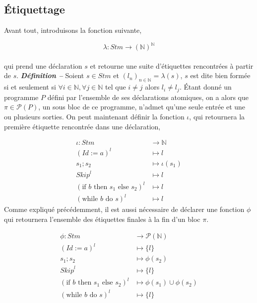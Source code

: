 \documentclass[a4paper, 12pt]{article}
\begin{document}
\subsection{Étiquettage}
Avant tout, introduisons la fonction suivante,

$$\lambda: Stm \longrightarrow (\mathbb{N})^\mathbb{N}$$\\
qui prend une déclaration $s$ et retourne une suite d'étiquettes rencontrées à partir de $s$.
\newline
\newline
\textit{\textbf{Définition --}} Soient $s \in Stm$ et $(l_n)_{n\in\mathbb{N}}=\lambda(s)$, $s$ est dite bien formée si et seulement 
si $\forall i \in \mathbb{N}, \forall j \in \mathbb{N}$ tel que $i \ne j$ alors $l_i \ne l_j$.
\newline
\newline
Étant donné un programme $P$ défini par l'ensemble de ses déclarations atomiques, on a alors que 
$\pi \in \mathcal{P}(P)$, un sous bloc de ce programme, n'admet qu'une seule entrée et une ou plusieurs sorties. 
On peut maintenant définir la fonction $\iota$, qui retournera la première étiquette rencontrée dans une déclaration,

\begin{align*}
	\iota : Stm &\longrightarrow \mathbb{N}\\
	(Id:=a)^l &\longmapsto l\\
	s_1 ; s_2 &\longmapsto \iota(s_1)\\
	\textit{Skip}^l &\longmapsto l\\
	(\text{if }b\text{ then }s_1\text{ else }s_2)^l &\longmapsto l\\
	(\text{while }b\text{ do }s)^l &\longmapsto l
\end{align*}
Comme expliqué précédemment, il est aussi nécessaire de déclarer une fonction $\phi$ qui retournera l'ensemble des étiquettes finales 
à la fin d'un bloc $\pi$.

\begin{align*}
	\phi : Stm &\longrightarrow \mathcal{P}(\mathbb{N})\\
	(Id:=a)^l &\longmapsto \{l\}\\
	s_1 ; s_2 &\longmapsto \phi(s_2)\\
	\textit{Skip}^l &\longmapsto \{l\}\\
	(\text{if }b\text{ then }s_1\text{ else }s_2)^l &\longmapsto \phi(s_1) \cup \phi(s_2)\\
	(\text{while }b\text{ do }s)^l &\longmapsto \{l\}
\end{align*}
\end{document}
